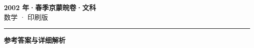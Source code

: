 \documentclass[zihao=5, a4paper]{ctexart}
\begin{document}
\begin{center}
  {\Large\bfseries 2002 年·春季京蒙皖卷·文科}\\[4pt]
  {\large 数学 · 印刷版}
\end{center}
\medskip
{}

\par\bigskip\hrule\bigskip
{}
\begin{center}{\large\bfseries 参考答案与详细解析}\end{center}
\smallskip

\end{document}
